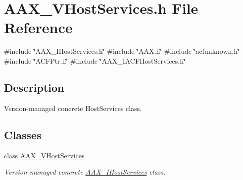 \hypertarget{a00716}{}\section{A\+A\+X\+\_\+\+V\+Host\+Services.\+h File Reference}
\label{a00716}
{\ttfamily \#include \char`\"{}A\+A\+X\+\_\+\+I\+Host\+Services.\+h\char`\"{}}\newline
{\ttfamily \#include \char`\"{}A\+A\+X.\+h\char`\"{}}\newline
{\ttfamily \#include \char`\"{}acfunknown.\+h\char`\"{}}\newline
{\ttfamily \#include \char`\"{}A\+C\+F\+Ptr.\+h\char`\"{}}\newline
{\ttfamily \#include \char`\"{}A\+A\+X\+\_\+\+I\+A\+C\+F\+Host\+Services.\+h\char`\"{}}\newline


\subsection{Description}
Version-\/managed concrete Host\+Services class. 

\subsection*{Classes}
\begin{DoxyCompactItemize}
\item 
class \mbox{\hyperlink{a01925}{A\+A\+X\+\_\+\+V\+Host\+Services}}
\begin{DoxyCompactList}\small\item\em Version-\/managed concrete \mbox{\hyperlink{a01841}{A\+A\+X\+\_\+\+I\+Host\+Services}} class. \end{DoxyCompactList}\end{DoxyCompactItemize}
